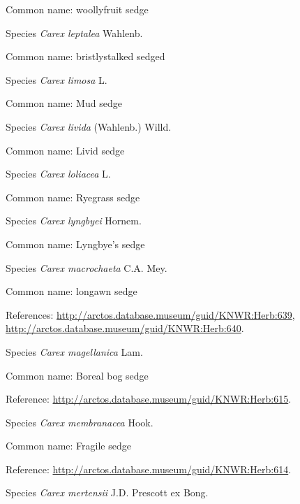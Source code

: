 \documentclass[9pt, article]{memoir}
\begin{document}
\begin{multicols}{2}
Common name: woollyfruit sedge

\vspace{6pt}\noindent\hspace{36pt}Species \textit{Carex leptalea} Wahlenb.


Common name: bristlystalked sedged

\vspace{6pt}\noindent\hspace{36pt}Species \textit{Carex limosa} L.


Common name: Mud sedge

\vspace{6pt}\noindent\hspace{36pt}Species \textit{Carex livida} (Wahlenb.) Willd.


Common name: Livid sedge

\vspace{6pt}\noindent\hspace{36pt}Species \textit{Carex loliacea} L.


Common name: Ryegrass sedge

\vspace{6pt}\noindent\hspace{36pt}Species \textit{Carex lyngbyei} Hornem.


Common name: Lyngbye's sedge

\vspace{6pt}\noindent\hspace{36pt}Species \textit{Carex macrochaeta} C.A. Mey.


Common name: longawn sedge

References: 
\url{http://arctos.database.museum/guid/KNWR:Herb:639}, 
\url{http://arctos.database.museum/guid/KNWR:Herb:640}.

\vspace{6pt}\noindent\hspace{36pt}Species \textit{Carex magellanica} Lam.


Common name: Boreal bog sedge

Reference: 
\url{http://arctos.database.museum/guid/KNWR:Herb:615}.

\vspace{6pt}\noindent\hspace{36pt}Species \textit{Carex membranacea} Hook.


Common name: Fragile sedge

Reference: 
\url{http://arctos.database.museum/guid/KNWR:Herb:614}.

\vspace{6pt}\noindent\hspace{36pt}Species \textit{Carex mertensii} J.D. Prescott ex Bong.



\end{multicols}
\end{document}
